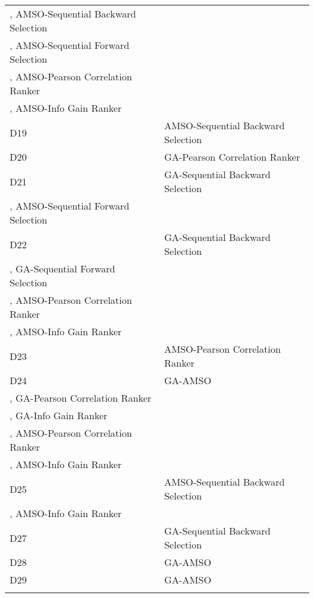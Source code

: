 \begin{table}
\begin{tabular}{ll}
, AMSO-Sequential Backward Selection\\
, AMSO-Sequential Forward Selection\\
, AMSO-Pearson Correlation Ranker\\
, AMSO-Info Gain Ranker\\
D19&AMSO-Sequential Backward Selection\\
D20&GA-Pearson Correlation Ranker\\
D21&GA-Sequential Backward Selection\\
, AMSO-Sequential Forward Selection\\
D22&GA-Sequential Backward Selection\\
, GA-Sequential Forward Selection\\
, AMSO-Pearson Correlation Ranker\\
, AMSO-Info Gain Ranker\\
D23&AMSO-Pearson Correlation Ranker\\
D24&GA-AMSO\\
, GA-Pearson Correlation Ranker\\
, GA-Info Gain Ranker\\
, AMSO-Pearson Correlation Ranker\\
, AMSO-Info Gain Ranker\\
D25&AMSO-Sequential Backward Selection\\
, AMSO-Info Gain Ranker\\
D27&GA-Sequential Backward Selection\\
D28&GA-AMSO\\
D29&GA-AMSO\\
\noalign{\smallskip}\hline
\end{tabular}
\end{table}
